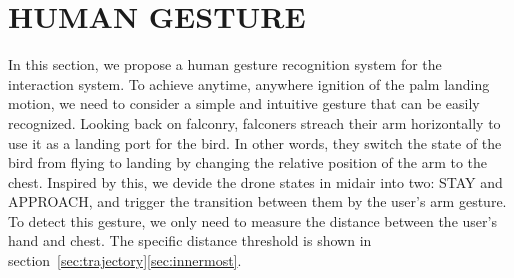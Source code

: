 \section{HUMAN GESTURE}

In this section, we propose a human gesture recognition system for the interaction system.
To achieve anytime, anywhere ignition of the palm landing motion, we need to consider a simple and intuitive gesture that can be easily recognized.
Looking back on falconry, falconers streach their arm horizontally to use it as a landing port for the bird.
In other words, they switch the state of the bird from flying to landing by changing the relative position of the arm to the chest.
Inspired by this, we devide the drone states in midair into two: STAY and APPROACH,
and trigger the transition between them by the user's arm gesture.
To detect this gesture, we only need to measure the distance between the user's hand and chest.
The specific distance threshold is shown in section~\ref{sec:trajectory}\ref{sec:innermost}.
